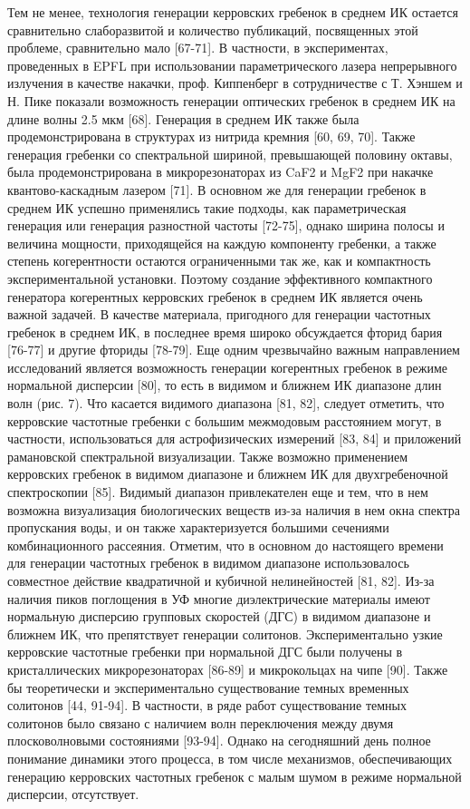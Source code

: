 Тем не менее, технология генерации керровских гребенок в среднем ИК остается сравнительно слаборазвитой и количество публикаций, посвященных этой проблеме, сравнительно мало [67-71]. В частности, в экспериментах, проведенных в EPFL при использовании параметрического лазера непрерывного излучения в качестве накачки, проф. Киппенберг в сотрудничестве с Т. Хэншем и Н. Пике показали возможность генерации оптических гребенок в среднем ИК на длине волны 2.5 мкм [68]. Генерация в среднем ИК также была продемонстрирована в структурах из нитрида кремния [60, 69, 70]. Также генерация гребенки со спектральной шириной, превышающей половину октавы, была продемонстрирована в микрорезонаторах из CaF2 и MgF2 при накачке квантово-каскадным лазером [71]. В основном же для генерации гребенок в среднем ИК успешно применялись такие подходы, как параметрическая генерация или генерация разностной частоты [72-75], однако ширина полосы и величина мощности, приходящейся на каждую компоненту гребенки, а также степень когерентности остаются ограниченными так же, как и компактность экспериментальной установки. Поэтому создание эффективного компактного генератора когерентных керровских гребенок в среднем ИК является очень важной задачей. В качестве материала, пригодного для генерации частотных гребенок в среднем ИК, в последнее время широко обсуждается фторид бария [76-77] и другие фториды [78-79].
Еще одним чрезвычайно важным направлением исследований является возможность генерации когерентных гребенок в режиме нормальной дисперсии [80], то есть в видимом и ближнем ИК диапазоне длин волн (рис. 7). Что касается видимого диапазона [81, 82], следует отметить, что керровские частотные гребенки с большим межмодовым расстоянием могут, в частности, использоваться для астрофизических измерений [83, 84] и приложений рамановской спектральной визуализации. Также возможно применением керровских гребенок в видимом диапазоне и ближнем ИК для двухгребеночной спектроскопии [85]. Видимый диапазон привлекателен еще и тем, что в нем возможна визуализация биологических веществ из-за наличия в нем окна спектра пропускания воды, и он также характеризуется большими сечениями комбинационного рассеяния. Отметим, что в основном до настоящего времени для генерации частотных гребенок в видимом диапазоне использовалось совместное действие квадратичной и кубичной нелинейностей [81, 82].
Из-за наличия пиков поглощения в УФ многие диэлектрические материалы имеют нормальную дисперсию групповых скоростей (ДГС) в видимом диапазоне и ближнем ИК, что препятствует генерации солитонов. Экспериментально узкие керровские частотные гребенки при нормальной ДГС были получены в кристаллических микрорезонаторах [86-89] и микрокольцах на чипе [90]. Также бы теоретически и экспериментально существование темных временных солитонов [44, 91-94]. В частности, в ряде работ существование темных солитонов было связано с наличием волн переключения между двумя плосковолновыми состояниями [93-94]. Однако на сегодняшний день полное понимание динамики этого процесса, в том числе механизмов, обеспечивающих генерацию керровских частотных гребенок с малым шумом в режиме нормальной дисперсии, отсутствует.
